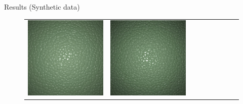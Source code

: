 \documentclass[final]{beamer}
\newlength{\twocolwid}
\newlength{\resultwidth}
\begin{document}
\begin{frame}[t]
\begin{columns}[t]
\begin{column}{\twocolwid}
\begin{block}{Results (Synthetic data)}
\begin{figure}[t]
\begin{tabular}{ccrclcccc}
            		\includegraphics[width=\resultwidth]{synth/leather/good1.jpg} &
            		\includegraphics[width=\resultwidth]{synth/leather/good2.jpg} &

\end{tabular}
\end{figure}
\end{block}
\end{column}
\end{columns}
\end{frame}
\end{document}
